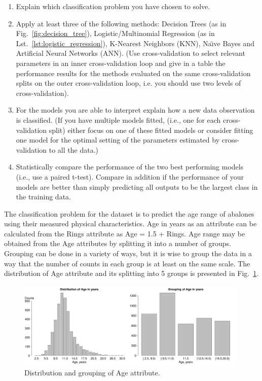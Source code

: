 \documentclass[10pt, paper=a4]{article}
\begin{document}
\begin{enumerate}
\item Explain which classification problem you have chosen to solve.
\item Apply at least three of the following methods: Decision Trees
  (as in Fig.~\ref{fig:decision_tree}), Logistic/Multinomial
  Regression (as in Lst.~\ref{lst:logistic_regression}), K-Nearest
  Neighbors (KNN), Naı̈ve Bayes and Artificial Neural Networks (ANN).
  (Use cross-validation to select relevant parameters in an inner
  cross-validation loop and give in a table the performance results
  for the methods evaluated on the same cross-validation splits on the
  outer cross-validation loop, i.e. you should use two levels of
  cross-validation).
\item For the models you are able to interpret explain how a new data
  observation is classified.  (If you have multiple models fitted,
  (i.e., one for each cross-validation split) either focus on one of
  these fitted models or consider fitting one model for the optimal
  setting of the parameters estimated by cross-validation to all the
  data.)
\item Statistically compare the performance of the two best performing
  models (i.e., use a paired t-test). Compare in addition if the
  performance of your models are better than simply predicting all
  outputs to be the largest class in the training data.
\end{enumerate}


The classification problem for the dataset is to predict the age range
of abalones using their measured physical characteristics.  Age in
years as an attribute can be calculated from the Rings attribute as
Age = 1.5 + Rings.  Age range may be obtained from the Age attributes
by splitting it into a number of groups.  Grouping can be done in a
variety of ways, but it is wise to group the data in a way that the
number of counts in each group is at least on the same scale.  The
distribution of Age attribute and its splitting into 5 groups is
presented in Fig.~\ref{fig:age_grouping}.

\begin{figure}[htbp]
  \centering
  \includegraphics[width = 0.99\textwidth]{age_grouping.pdf}
  \caption{Distribution and grouping of Age attribute.}
  \label{fig:age_grouping}
\end{figure}
\end{document}
